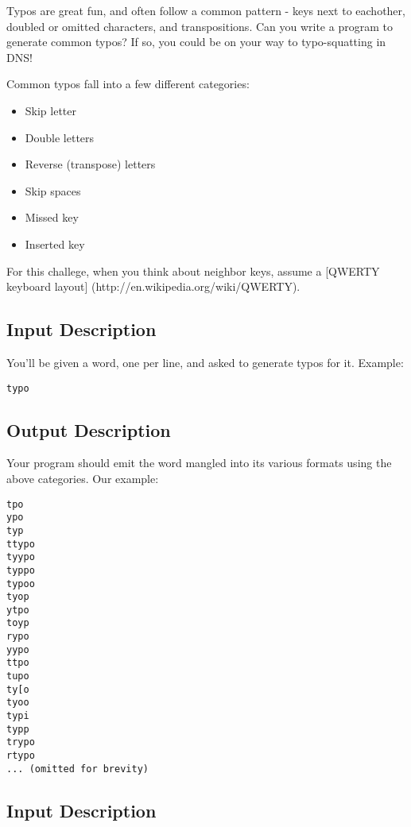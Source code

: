 Typos are great fun, and often follow a common pattern - keys next to
eachother, doubled or omitted characters, and transpositions. Can you
write a program to generate common typos? If so, you could be on your
way to typo-squatting in DNS!

Common typos fall into a few different categories:

\begin{itemize}
\itemsep1pt\parskip0pt
\item
  Skip letter
\item
  Double letters
\item
  Reverse (transpose) letters
\item
  Skip spaces
\item
  Missed key
\item
  Inserted key
\end{itemize}

For this challege, when you think about neighbor keys, assume a
{[}QWERTY keyboard layout{]} (http://en.wikipedia.org/wiki/QWERTY).

\subsection*{Input Description}\label{input-description-27}

You'll be given a word, one per line, and asked to generate typos for
it. Example:

\begin{lstlisting}
typo
\end{lstlisting}

\subsection*{Output Description}\label{output-description-29}

Your program should emit the word mangled into its various formats using
the above categories. Our example:

\begin{lstlisting}
tpo
ypo
typ
ttypo
tyypo
typpo
typoo
tyop
ytpo
toyp
rypo
yypo
ttpo
tupo
ty[o
tyoo
typi
typp
trypo
rtypo
... (omitted for brevity)
\end{lstlisting}

\subsection*{Input Description}\label{input-description-28}

